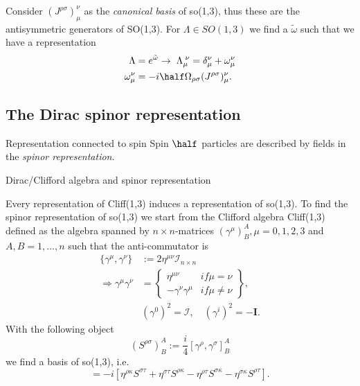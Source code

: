 Consider $(J^{\rho \sigma})^{\nu}_{\mu}$ as the \emph{canonical basis} of so(1,3), thus these are the antisymmetric generators of SO(1,3). For $\Lambda \in SO(1,3)$ we find a $\tilde{\omega}$ such that we have a representation
\begin{align}
	\Lambda &= e^{\tilde{\omega}} \rightarrow \; \Lambda^{\;\nu}_{\mu} = \delta^{\nu}_{\mu} + \omega^{\nu}_{\mu} \\
	\omega^{\nu}_{\mu} &= -i \half \Omega_{\rho \sigma} (J^{\rho \sigma})^{\nu}_{\mu}.
\end{align}

\subsection{The Dirac spinor representation}
\begin{mybox}{Representation connected to spin }
	Spin $\half$ particles are described by fields in the \emph{spinor representation}.
\end{mybox}
\begin{mybox}{Dirac/Clifford algebra and spinor representation}
	
Every representation of Cliff(1,3) induces a representation of so(1,3). To find the spinor representation of so(1,3) we start from the Clifford algebra Cliff(1,3) defined as the algebra spanned by $n \times n$-matrices $(\gamma^{\mu})^A_B, \mu=0,1,2,3$ and $A,B=1,\dots,n$ such that the anti-commutator is
\begin{align}
	\{\gamma^{\mu}, \gamma^{\nu} \} & := 2 \eta^{\mu \nu} \mathcal{I}_{n\times n} \\
	\Rightarrow \gamma^{\mu} \gamma^{\nu} &= 
	\left\{ \begin{array}{lr}
		\eta^{\mu \nu} & if \mu =\nu \\
		- \gamma^{\nu} \gamma^{\mu} & if \mu\neq \nu
	\end{array}		\right\},
 \\
&(\gamma^0)^2=\mathcal{I},\quad (\gamma^i)^2 = - \mathbf{I}.
\end{align}
With the following object 
\begin{equation}
	(S^{\rho \sigma})^A_B := \frac{i}{4} [\gamma^{\rho},\gamma^{\sigma}]^A_B
\end{equation}
we find a basis of so(1,3), i.e.
\begin{equation}
	[S^{\rho \sigma}, S^{\tau \kappa} ] = -i \left[\eta^{\rho \kappa} S^{\sigma \tau} + \eta^{\sigma \tau} S^{\rho \kappa} - \eta^{\rho \tau} S^{\sigma \kappa} - \eta^{\sigma \kappa} S^{\rho \tau} \right].
\end{equation}
\end{mybox}

